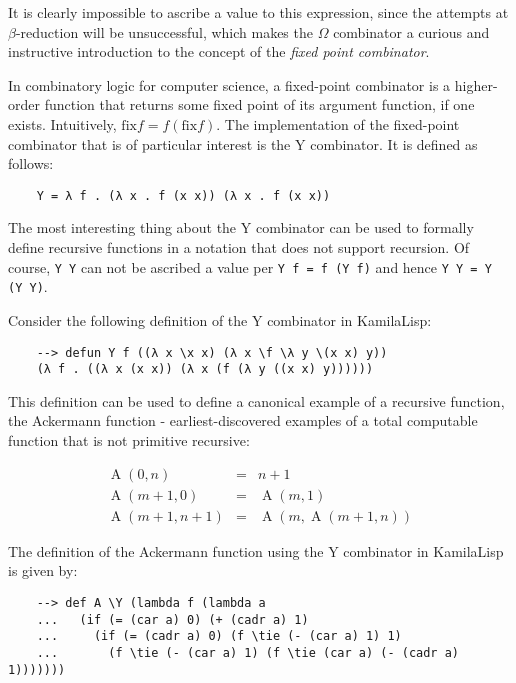 It is clearly impossible to ascribe a value to this expression, since the attempts at $\beta$-reduction will be unsuccessful, which makes the $\Omega$ combinator a curious and instructive introduction to the concept of the \textit{fixed point combinator}.

In combinatory logic for computer science, a fixed-point combinator is a higher-order function that returns some fixed point of its argument function, if one exists. Intuitively, $\text{fix} f = f (\text{fix} f)$. The implementation of the fixed-point combinator that is of particular interest is the Y combinator. It is defined as follows:

\begin{Verbatim}
    Y = λ f . (λ x . f (x x)) (λ x . f (x x))
\end{Verbatim}

The most interesting thing about the Y combinator can be used to formally define recursive functions in a notation that does not support recursion. Of course, \verb|Y Y| can not be ascribed a value per \verb|Y f = f (Y f)| and hence \verb|Y Y = Y (Y Y)|.

Consider the following definition of the Y combinator in KamilaLisp:

\begin{Verbatim}
    --> defun Y f ((λ x \x x) (λ x \f \λ y \(x x) y))
    (λ f . ((λ x (x x)) (λ x (f (λ y ((x x) y))))))
\end{Verbatim}

This definition can be used to define a canonical example of a recursive function, the Ackermann function - earliest-discovered examples of a total computable function that is not primitive recursive:

$$
\begin{array}{lcl}
    \operatorname {A} (0,n)&=&n+1\\
    \operatorname {A} (m+1,0)&=&\operatorname {A} (m,1)\\
    \operatorname {A} (m+1,n+1)&=&\operatorname {A} (m,\operatorname {A} (m+1,n))
\end{array}
$$

The definition of the Ackermann function using the Y combinator in KamilaLisp is given by:

\begin{Verbatim}
    --> def A \Y (lambda f (lambda a
    ...   (if (= (car a) 0) (+ (cadr a) 1)
    ...     (if (= (cadr a) 0) (f \tie (- (car a) 1) 1)
    ...       (f \tie (- (car a) 1) (f \tie (car a) (- (cadr a) 1)))))))
\end{Verbatim}

